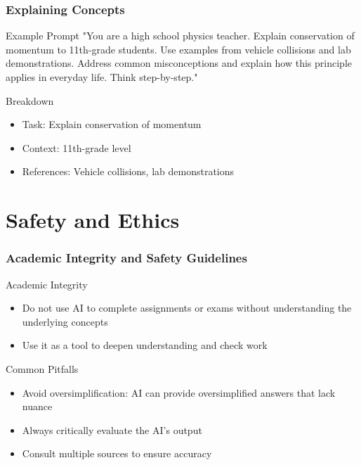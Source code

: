 \documentclass{beamer}
\begin{document}
\begin{frame}
\frametitle{Explaining Concepts}
\begin{exampleblock}{Example Prompt}
"You are a high school physics teacher. Explain conservation of momentum to 11th-grade students. Use examples from vehicle collisions and lab demonstrations. Address common misconceptions and explain how this principle applies in everyday life. Think step-by-step."
\end{exampleblock}

\begin{alertblock}{Breakdown}
\begin{itemize}
\item Task: Explain conservation of momentum
\item Context: 11th-grade level
\item References: Vehicle collisions, lab demonstrations
\end{itemize}
\end{alertblock}
\end{frame}

\section{Safety and Ethics}
\frame{\sectionpage}
\begin{frame}
\frametitle{Academic Integrity and Safety Guidelines}
\begin{block}{Academic Integrity}
\begin{itemize}
\item Do not use AI to complete assignments or exams without understanding the underlying concepts
\item Use it as a tool to deepen understanding and check work
\end{itemize}
\end{block}

\begin{alertblock}{Common Pitfalls}
\begin{itemize}
\item Avoid oversimplification: AI can provide oversimplified answers that lack nuance
\item Always critically evaluate the AI's output
\item Consult multiple sources to ensure accuracy
\end{itemize}
\end{alertblock}
\end{frame}
\end{document}

